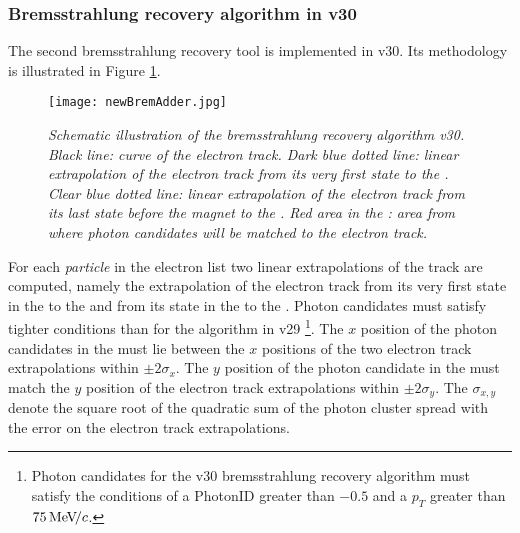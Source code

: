 \subsubsection{Bremsstrahlung recovery algorithm in \davinci v30}
\label{sub:newBrem}
The second bremsstrahlung recovery tool is implemented in \davinci v30. Its methodology is illustrated in Figure \ref{fig:newBremAdd}.
\begin{figure}[ht]
  \begin{center}
  \label{fig:newBremAdder}
  \texttt{[image: newBremAdder.jpg]}
  \end{center}
  \vspace{-0.8cm}
  \caption{\textit{Schematic illustration of the bremsstrahlung recovery algorithm \davinci v30. Black line: curve of the electron track. Dark blue dotted line: linear extrapolation of the electron track from its very first state to the \ecal. Clear blue dotted line: linear extrapolation of the electron track from its last state before the magnet to the \ecal. Red area in the \ecal: area from where photon candidates will be matched to the electron track.}}
  \label{fig:newBremAdd}
\end{figure}
For each \textit{particle} in the electron list two linear extrapolations of the track are computed, namely the extrapolation of the electron track from its very first state in the \velo to the \ecal and from its state in the \ttracker to the \ecal. Photon candidates must satisfy tighter conditions than for the algorithm in \davinci v29 \footnote{Photon candidates for the \davinci v30 bremsstrahlung recovery algorithm must satisfy the conditions of a PhotonID greater than $-0.5$ and a $p_T$ greater than $75 {\mathrm{\,Me\kern -0.1em V\!/}c}$.}.
The $x$ position of the photon candidates in the \ecal must lie between the $x$ positions of the two electron track extrapolations within $\pm 2 \sigma_{x}$. The $y$ position of the photon candidate in the \ecal must match the $y$ position of the electron track extrapolations within $\pm 2 \sigma_{y}$. The $\sigma_{x,y}$ denote the square root of the quadratic sum of the photon cluster spread with the error on the electron track extrapolations. \\



